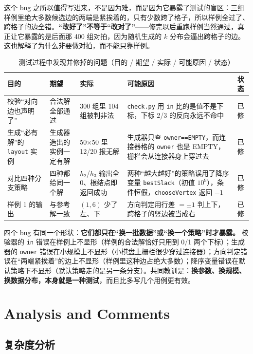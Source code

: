 \documentclass[12pt,a4paper,fontset=windows]{ctexart}
\newcommand{\code}[1]{\texttt{#1}}
\begin{document}
这个 bug 之所以值得写进来，不是因为难，而是因为它暴露了测试的盲区：三组样例里绝大多数候选边的两端是紧挨着的，只有少数跨了格子，所以样例全过了、跨格子的边全错。\textbf{“改好了”不等于“改对了”}——修完以后重跑样例当然通过，真正让它暴露的是后面那 400 组对拍，因为随机生成的 $k$ 分布会逼出跨格子的边。这也解释了为什么非要做对拍，而不能只靠样例。

\begin{table}[htbp]
\centering
\caption{测试过程中发现并修掉的问题（目的 / 期望 / 实际 / 可能原因 / 状态）}
\label{tab:bugs}
\footnotesize
\begin{tabular}{p{2.2cm}p{2.4cm}p{3.0cm}p{4.6cm}p{1.1cm}}
\toprule
\rowcolor{gray!12}目的 & 期望 & 实际 & 可能原因 & 状态 \\
\midrule
校验“对向边也声明了” & 合法解全部通过 & 300 组里 104 组被判非法 & \code{check.py} 用 \code{in} 比的是值不是下标，下标 2/3 的反向永远不命中 & 已修 \\
生成“必有解”的 \code{layout} 实例 & 生成器造出的实例一定有解 & 50×50 里 12/20 报无解 & 生成器只查 \code{owner==EMPTY}，而连接器格的 \code{owner} 也是 EMPTY，栅栏会从连接器身上穿过去 & 已修 \\
对比四种分支策略 & 四种都给同一个解 & $h_2$/$h_3$ 输出全 0、根结点即返回成功 & 两种“越大越好”的策略误用了降序变量 \code{bestSlack}（初值 $10^9$），条件恒假，\code{chooseVertex} 返回 $-1$ & 已修 \\
样例 1 的输出 & 与参考解一致 & $(1,6)$ 少了左、下 & 方向判定用行差 $=\pm1$ 判上下，跨格子的竖边被当成右 & 已修 \\
\bottomrule
\end{tabular}
\end{table}

四个 bug 有同一个形状：\textbf{它们都只在“换一批数据”或“换一个策略”时才暴露。} 校验器的 \code{in} 错误在样例上不显形（样例的合法解恰好只用到 0/1 两个下标）；生成器的 \code{owner} 错误在小规模上不显形（小棋盘上栅栏很少穿过连接器）；方向判定错误在“两端紧挨着”的边上不显形（样例里这种边占绝大多数）；降序变量错误在默认策略下不显形（默认策略走的是另一条分支）。共同教训是：\textbf{换参数、换规模、换数据分布，本身就是一种测试}，而且比多写几个用例更有效。

\section{Analysis and Comments}

\subsection{复杂度分析}
\end{document}
